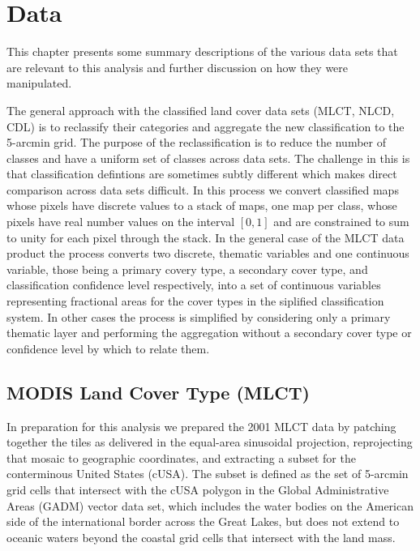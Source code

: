 







\graphicspath{ {datasets/} }


\chapter{Data}
\label{cha:data}

This chapter presents some summary descriptions of the various data
sets that are relevant to this analysis and further discussion on how
they were manipulated.

The general approach with the classified land cover data sets (MLCT,
NLCD, CDL) is to reclassify their categories and aggregate the new
classification to the 5-arcmin grid.  The purpose of the
reclassification is to reduce the number of classes and have a uniform
set of classes across data sets.  The challenge in this is that
classification defintions are sometimes subtly different which makes
direct comparison across data sets difficult.  In this process we
convert classified maps whose pixels have discrete values to a stack
of maps, one map per class, whose pixels have real number values on
the interval $[0,1]$ and are constrained to sum to unity for each
pixel through the stack.  In the general case of the MLCT data product
the process converts two discrete, thematic variables and one
continuous variable, those being a primary covery type, a secondary
cover type, and classification confidence level respectively, into a
set of continuous variables representing fractional areas for the
cover types in the siplified classification system.  In other cases
the process is simplified by considering only a primary thematic layer
and performing the aggregation without a secondary cover type or
confidence level by which to relate them.


\section{MODIS Land Cover Type (MLCT)}
\label{sec:mlct}

In preparation for this analysis we prepared the 2001 MLCT data by patching
together the tiles as delivered in the equal-area sinusoidal
projection, reprojecting that mosaic to geographic coordinates, and
extracting a subset for the conterminous United States (cUSA).  The
subset is defined as the set of 5-arcmin grid cells that intersect
with the cUSA polygon in the Global Administrative Areas (GADM) vector
data set, which includes the water bodies on the American side of the
international border across the Great Lakes, but does not extend to
oceanic waters beyond the coastal grid cells that intersect with the
land mass.  

